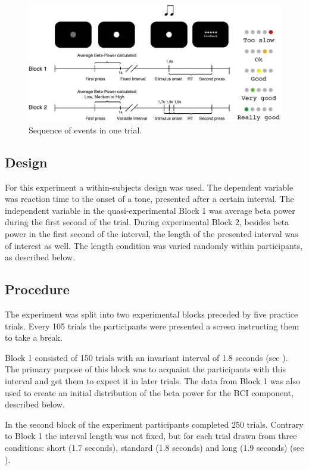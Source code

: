 \documentclass[man,floatsintext]{apa6} %
\begin{document}
\begin{figure}[!h]
  \includegraphics[width=\textwidth]{trial}
  \caption{Sequence of events in one trial.}
  \label{fig:task}
\end{figure}

\subsection{Design}
For this experiment a within-subjects design was used. The dependent
variable was reaction time to the onset of a tone, presented after a
certain interval. The independent variable in the quasi-experimental
Block 1 was average beta power during the first second of the
trial. During experimental Block 2, besides beta power in the first
second of the interval, the length of the presented interval was of
interest as well. The length condition was varied randomly within
participants, as described below.

\subsection{Procedure}
The experiment was split into two experimental blocks preceded by five
practice trials. Every 105 trials the participants were presented a
screen instructing them to take a break.

Block 1 consisted of 150 trials with an invariant interval of 1.8
seconds (see ). The primary purpose of this block was
to acquaint the participants with this interval and get them to expect
it in later trials. The data from Block 1 was also used to create an
initial distribution of the beta power for the BCI component,
described below.

In the second block of the experiment participants completed 250
trials. Contrary to Block 1 the interval length was not fixed, but for
each trial drawn from three conditions: short (1.7 seconds), standard
(1.8 seconds) and long (1.9 seconds) (see ).
\end{document}
